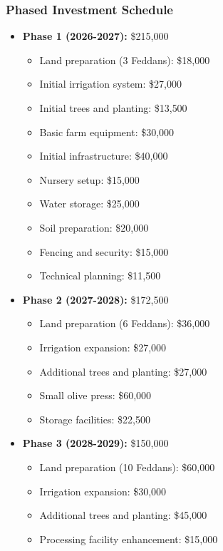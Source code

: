 \subsubsection{Phased Investment Schedule}
\begin{itemize}
    \item \textbf{Phase 1 (2026-2027):} \$215,000
    \begin{itemize}
        \item Land preparation (3 Feddans): \$18,000
        \item Initial irrigation system: \$27,000
        \item Initial trees and planting: \$13,500
        \item Basic farm equipment: \$30,000
        \item Initial infrastructure: \$40,000
        \item Nursery setup: \$15,000
        \item Water storage: \$25,000
        \item Soil preparation: \$20,000
        \item Fencing and security: \$15,000
        \item Technical planning: \$11,500
    \end{itemize}
    
    \item \textbf{Phase 2 (2027-2028):} \$172,500
    \begin{itemize}
        \item Land preparation (6 Feddans): \$36,000
        \item Irrigation expansion: \$27,000
        \item Additional trees and planting: \$27,000
        \item Small olive press: \$60,000
        \item Storage facilities: \$22,500
    \end{itemize}
    
    \item \textbf{Phase 3 (2028-2029):} \$150,000
    \begin{itemize}
        \item Land preparation (10 Feddans): \$60,000
        \item Irrigation expansion: \$30,000
        \item Additional trees and planting: \$45,000
        \item Processing facility enhancement: \$15,000
    \end{itemize}
    

\end{itemize}
